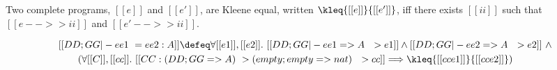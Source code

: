 \begin{definition}
  Two complete programs, $[[e]]$ and $[[e']]$, are Kleene equal, written
  $\kleq{[[e]]}{[[e']]}$, iff there exists $[[ii]]$ such that $[[e -->> ii]]$ and
  $[[e' -->> ii]]$.
\end{definition}

\begin{definition} \label{def:cxtx2}
  {\small
  \begin{align*}
    &[[DD ; GG |- ee1 ~= ee2 : A]]  \defeq \forall [[e1]], [[e2]].\  [[DD ; GG |- ee1 => A ~~> e1]] \land [[DD ; GG |- ee2 => A ~~> e2]] \ \land   \\
    &\qquad (\forall [[C]], [[cc]].\ [[CC : (DD; GG => A) ~> (empty ; empty => nat) ~~> cc]] \Longrightarrow \kleq{[[cc{e1}]]}{[[cc{e2}]]})
  \end{align*}
  }%
\end{definition}







